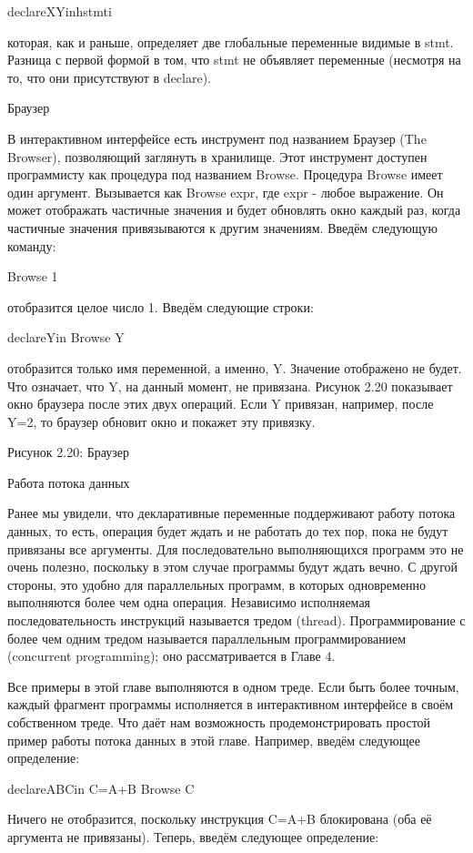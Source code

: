 declareXYinhstmti

которая, как и раньше, определяет две глобальные переменные видимые в stmt. Разница с первой формой в том, что stmt не объявляет переменные (несмотря на то, что они присутствуют в declare).

Браузер

В интерактивном интерфейсе есть инструмент под названием Браузер (The Browser), позволяющий заглянуть в хранилище. Этот инструмент доступен программисту как процедура под названием Browse. Процедура Browse имеет один аргумент. Вызывается как {Browse expr}, где expr - любое выражение. Он может отображать частичные значения и будет обновлять окно каждый раз, когда частичные значения привязываются к другим значениям. Введём следующую команду:

{Browse 1}

отобразится целое число 1. Введём следующие строки:

declareYin
{Browse Y}

отобразится только имя переменной, а именно, Y. Значение отображено не будет. Что означает, что Y, на данный момент, не привязана. Рисунок 2.20 показывает окно браузера после этих двух операций. Если Y привязан, например, после Y=2, то браузер обновит окно и покажет эту привязку.

Рисунок 2.20: Браузер

Работа потока данных

Ранее мы увидели, что декларативные переменные поддерживают работу потока данных, то есть, операция будет ждать и не работать до тех пор, пока не будут привязаны все аргументы. Для последовательно выполняющихся программ это не очень полезно, поскольку в этом случае программы будут ждать вечно. С другой стороны, это удобно для параллельных программ, в которых одновременно выполняются более чем одна операция. Независимо исполняемая последовательность инструкций называется тредом (thread). Программирование с более чем одним тредом называется параллельным программированием (concurrent programming); оно рассматривается в Главе 4.

Все примеры в этой главе выполняются в одном треде. Если быть более точным, каждый фрагмент программы исполняется в интерактивном интерфейсе в своём собственном треде. Что даёт нам возможность продемонстрировать простой пример работы потока данных в этой главе. Например, введём следующее определение:

declareABCin
C=A+B
{Browse C}

Ничего не отобразится, поскольку инструкция C=A+B блокирована (оба её аргумента не привязаны). Теперь, введём следующее определение:

